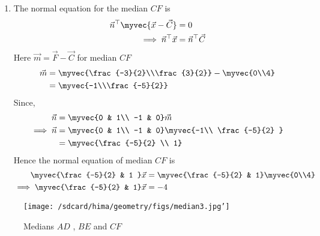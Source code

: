 \documentclass[11pt]{book}
\begin{document}
\begin{enumerate}[label=\thesection.\arabic*.,ref=\thesection.\theenumi]
\begin{enumerate}
\item The normal equation for the median $CF$ is
\begin{align}
\vec{n}^{\top}\myvec{\vec{x}-\vec{C}}&=0\\
\implies
\vec{n}^{\top}\vec{x}&=\vec{n}^{\top}\vec{C}
\end{align}
Here $\vec{m} = \vec{F}- \vec{C}$ for median $CF$
\begin{align}
\vec{m}&=\myvec{\frac{-3}{2}\\\frac{3}{2}} - \myvec{0\\4}\\
       &=\myvec{-1\\\frac{-5}{2}}
\end{align}
Since,
\begin{align}
  \vec{n} &= \myvec{0 & 1\\
  -1 & 0}\vec{m}\\
\implies
\vec{n} &= \myvec{0 & 1\\
  -1 & 0}\myvec{-1\\ \frac{-5}{2} }\\
        &= \myvec{\frac{-5}{2} \\ 1}
\end{align}
Hence the normal equation of median $CF$ is 
\begin{align}
    \myvec{\frac{-5}{2} & 1 }\vec{x}&=\myvec{\frac{-5}{2} & 1}\myvec{0\\4}\\
\implies
    \myvec{\frac{-5}{2} & 1}\vec{x}&=-4
\end{align}
\end{enumerate}
\begin{figure}
\texttt{[image: /sdcard/hima/geometry/figs/median3.jpg']}
\caption{ Medians $AD$ , $BE$ and $CF$}
\label{fig: medians}
\end{figure}



\end{enumerate}
\end{document}
